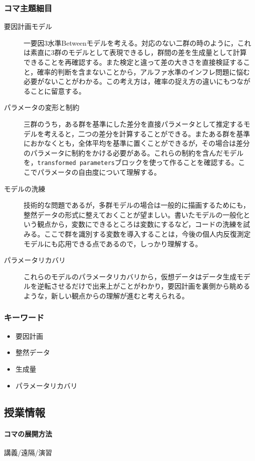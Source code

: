 \subsubsection{コマ主題細目}
\begin{description}

\item[要因計画モデル] 一要因3水準Betweenモデルを考える。対応のない二群の時のように，これは素直に3群のモデルとして表現できるし，群間の差を生成量として計算できることを再確認する。また検定と違って差の大きさを直接検証すること，確率的判断を含まないことから，アルファ水準のインフレ問題に悩む必要がないことがわかる。この考え方は，確率の捉え方の違いにもつながることに留意する。
\item[パラメータの変形と制約] 三群のうち，ある群を基準にした差分を直接パラメータとして推定するモデルを考えると，二つの差分を計算することができる。またある群を基準におかなくとも，全体平均を基準に置くことができるが，その場合は差分のパラメータに制約をかける必要がある。これらの制約を含んだモデルを，\verb|transformed parameters|ブロックを使って作ることを確認する。ここでパラメータの自由度について理解する。
\item[モデルの洗練] 技術的な問題であるが，多群モデルの場合は一般的に描画するためにも，整然データの形式に整えておくことが望ましい。書いたモデルの一般化という観点から，変数にできるところは変数にするなど，コードの洗練を試みる。ここで群を識別する変数を導入することは，今後の個人内反復測定モデルにも応用できる点であるので，しっかり理解する。
\item[パラメータリカバリ] これらのモデルのパラメータリカバリから，仮想データはデータ生成モデルを逆転させるだけで出来上がことがわかり，要因計画を裏側から眺めるような，新しい観点からの理解が進むと考えられる。

\end{description}
\subsubsection{キーワード}
\begin{itemize}
    \item 要因計画
    \item 整然データ
    \item 生成量
    \item パラメータリカバリ
\end{itemize}
\subsection{授業情報}
\paragraph{コマの展開方法}
講義/遠隔/演習
